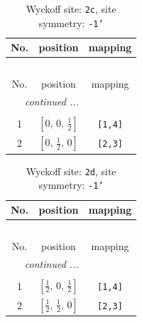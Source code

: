 \documentclass[fleqn,8pt]{jsarticle}
\begin{document}
\begin{longtable}{ccc}
\caption{Wyckoff site: {\tt 2c}, site symmetry: {\tt -1'}}
 \\
 \hline \hline
No. & position & mapping \\ \hline \endfirsthead

\multicolumn{2}{l}{\tablename\ \thetable{}} \\
 \hline \hline
No. & position & mapping \\ \hline \endhead

 \hline \hline
\multicolumn{2}{r}{\footnotesize\it continued ...} \\ \endfoot

 \hline \hline
\multicolumn{2}{r}{} \\ \endlastfoot

1 & $\left[ 0,\, 0,\, \frac{1}{2} \right]$ & {\tt [1,4]} \\ \hline
2 & $\left[ 0,\, \frac{1}{2},\, 0 \right]$ & {\tt [2,3]} \\
\end{longtable}
\renewcommand{\arraystretch}{1.2}
\begin{longtable}{ccc}
\caption{Wyckoff site: {\tt 2d}, site symmetry: {\tt -1'}}
 \\
 \hline \hline
No. & position & mapping \\ \hline \endfirsthead

\multicolumn{2}{l}{\tablename\ \thetable{}} \\
 \hline \hline
No. & position & mapping \\ \hline \endhead

 \hline \hline
\multicolumn{2}{r}{\footnotesize\it continued ...} \\ \endfoot

 \hline \hline
\multicolumn{2}{r}{} \\ \endlastfoot

1 & $\left[ \frac{1}{2},\, 0,\, \frac{1}{2} \right]$ & {\tt [1,4]} \\ \hline
2 & $\left[ \frac{1}{2},\, \frac{1}{2},\, 0 \right]$ & {\tt [2,3]} \\
\end{longtable}
\renewcommand{\arraystretch}{1.2}
\end{document}
